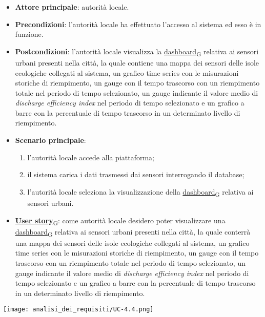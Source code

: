\newpage
{}
\begin{itemize}
	\item \textbf{Attore principale}: autorità locale.
	\item \textbf{Precondizioni}: l'autorità locale ha effettuato l'accesso al sistema ed esso è in funzione.
	\item \textbf{Postcondizioni}: l'autorità locale visualizza la \href{https://7last.github.io/docs/pb/documentazione-interna/glossario\#dashboard}{dashboard\textsubscript{G}} relativa ai sensori urbani presenti nella città, la quale contiene una mappa dei sensori delle isole ecologiche collegati al sistema, un grafico time series con le misurazioni storiche di riempimento, un gauge con il tempo trascorso con un riempimento totale nel periodo di tempo selezionato, un gauge indicante il valore medio di \textit{discharge efficiency index} nel periodo di tempo selezionato e un grafico a barre con la percentuale di tempo trascorso in un determinato livello di riempimento.
	\item \textbf{Scenario principale}:
	      \begin{enumerate}
		      \item l'autorità locale accede alla piattaforma;
		      \item il sistema carica i dati trasmessi dai sensori interrogando il database;
		      \item l'autorità locale seleziona la visualizzazione della \href{https://7last.github.io/docs/pb/documentazione-interna/glossario\#dashboard}{dashboard\textsubscript{G}} relativa ai sensori urbani.
	      \end{enumerate}
	\item \href{https://7last.github.io/docs/pb/documentazione-interna/glossario\#user-story}{\textbf{User story}\textsubscript{G}}:
	      come autorità locale desidero poter visualizzare una \href{https://7last.github.io/docs/pb/documentazione-interna/glossario\#dashboard}{dashboard\textsubscript{G}} relativa ai sensori urbani presenti nella città, la quale conterrà una mappa dei sensori delle isole ecologiche collegati al sistema, un grafico time series con le misurazioni storiche di riempimento, un gauge con il tempo trascorso con un riempimento totale nel periodo di tempo selezionato, un gauge indicante il valore medio di \textit{discharge efficiency index} nel periodo di tempo selezionato e un grafico a barre con la percentuale di tempo trascorso in un determinato livello di riempimento.
\end{itemize}
\begin{center}
	\texttt{[image: analisi\_dei\_requisiti/UC-4.4.png]}
\end{center}

